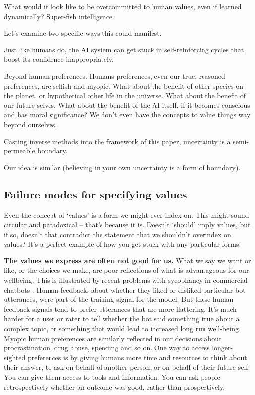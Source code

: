 What would it look like to be overcommitted to human values, even if learned dynamically? Super-fish intelligence.

Let's examine two specific ways this could manifest. 

Just like humans do, the AI system can get stuck in self-reinforcing cycles that boost its confidence inappropriately. 

Beyond human preferences. Humans preferences, even our true, reasoned preferences, are selfish and myopic. What about the benefit of other species on the planet, or hypothetical other life in the universe. What about the benefit of our future selves. What about the benefit of the AI itself, if it becomes conscious and has moral significance? We don't even have the concepts to value things way beyond ourselves. 

Casting inverse methods into the framework of this paper, uncertainty is a semi-permeable boundary. 

Our idea is similar (believing in your own uncertainty is a form of boundary).

\subsection{Failure modes for specifying values}

Even the concept of `values' is a form we might over-index on. This might sound circular and paradoxical -- that's because it is. Doesn't `should' imply values, but if so, doesn't that contradict the statement that we shouldn't overindex on values? It's a perfect example of how you get stuck with any particular forms.

\textbf{The values we express are often not good for us.} What we say we want or like, or the choices we make, are poor reflections of what is advantageous for our wellbeing. This is illustrated by recent problems with sycophancy in commercial chatbots \citep{openai2025sycophancy}. Human feedback, about whether they liked or disliked particular bot utterances, were part of the training signal for the model. But these human feedback signals tend to prefer utterances that are more flattering. It's much harder for a user or rater to tell whether the bot said something true about a complex topic, or something that would lead to increased long run well-being. Myopic human preferences are similarly reflected in our decisions about procrastination, drug abuse, spending and so on. One way to access longer-sighted preferences is by giving humans more time and resources to think about their answer, to ask on behalf of another person, or on behalf of their future self. You can give them access to tools and information. You can ask people retrospectively whether an outcome was good, rather than prospectively. 

